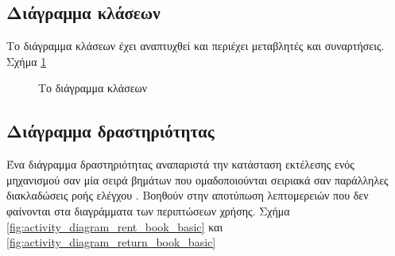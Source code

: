 \documentclass{assignment}
\begin{document}
\subsection{Διάγραμμα κλάσεων}

Το διάγραμμα κλάσεων έχει αναπτυχθεί και περιέχει μεταβλητές και συναρτήσεις. Σχήμα \ref{fig:Class_Diagramm}

\begin{landscape}
\begin{figure}
\begin{center}
\caption{Το διάγραμμα κλάσεων}
\label{fig:Class_Diagramm}
\end{center}
\end{figure}
\end{landscape}

\subsection{Διάγραμμα δραστηριότητας}

Ένα διάγραμμα δραστηριότητας αναπαριστά την κατάσταση εκτέλεσης ενός μηχανισμού σαν μία σειρά βημάτων που ομαδοποιούνται σειριακά σαν παράλληλες διακλαδώσεις ροής ελέγχου \cite{virvou_uml}. Βοηθούν στην αποτύπωση λεπτομερειών που δεν φαίνονται στα διαγράμματα των περιπτώσεων χρήσης.
Σχήμα \ref{fig:activity_diagram_rent_book_basic} και \ref{fig:activity_diagram_return_book_basic}
\end{document}
